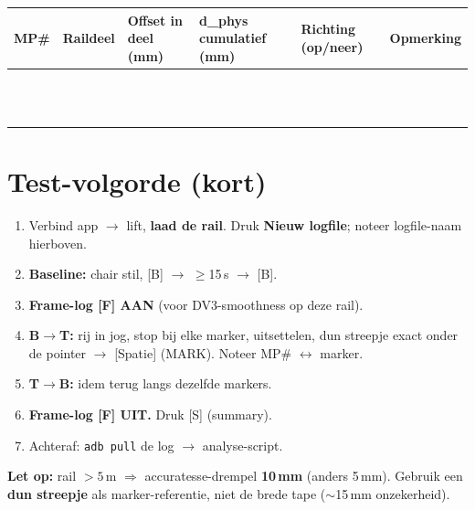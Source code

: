 \documentclass[10pt,a4paper]{article}
\begin{document}
\renewcommand{\arraystretch}{1.9}
\begin{tabular}{|c|c|p{2.6cm}|p{2.8cm}|p{2.2cm}|p{4.0cm}|}
\hline
\textbf{MP\#} & \textbf{Raildeel} & \textbf{Offset in deel (mm)} & \textbf{d\_phys cumulatief (mm)} & \textbf{Richting (op/neer)} & \textbf{Opmerking} \\
\hline
 & & & & & \\ \hline
 & & & & & \\ \hline
 & & & & & \\ \hline
 & & & & & \\ \hline
 & & & & & \\ \hline
 & & & & & \\ \hline
 & & & & & \\ \hline
 & & & & & \\ \hline
 & & & & & \\ \hline
 & & & & & \\ \hline
 & & & & & \\ \hline
 & & & & & \\ \hline
\end{tabular}

\section{Test-volgorde (kort)}
\begin{enumerate}[leftmargin=1.5em,itemsep=2pt,topsep=2pt]
\item Verbind app $\rightarrow$ lift, \textbf{laad de rail}. Druk \textbf{Nieuw logfile}; noteer logfile-naam hierboven.
\item \textbf{Baseline:} chair stil, [B] $\rightarrow$ $\geq$15\,s $\rightarrow$ [B].
\item \textbf{Frame-log [F] AAN} (voor DV3-smoothness op deze rail).
\item \textbf{B$\rightarrow$T:} rij in jog, stop bij elke marker, uitsettelen, dun streepje exact onder de pointer $\rightarrow$ [Spatie] (MARK). Noteer MP\# $\leftrightarrow$ marker.
\item \textbf{T$\rightarrow$B:} idem terug langs dezelfde markers.
\item \textbf{Frame-log [F] UIT.} Druk [S] (summary).
\item Achteraf: \texttt{adb pull} de log $\rightarrow$ analyse-script.
\end{enumerate}

{\footnotesize \textbf{Let op:} rail $>5$\,m $\Rightarrow$ accuratesse-drempel \textbf{10\,mm} (anders 5\,mm). \quad Gebruik een \textbf{dun streepje} als marker-referentie, niet de brede tape ($\sim$15\,mm onzekerheid).}
\end{document}
